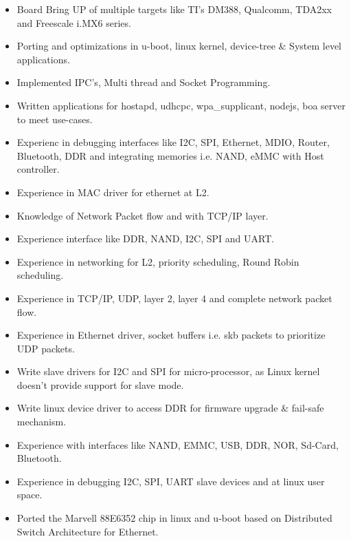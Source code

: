 \begin{minipage}[b]{\textwidth}%
  \setlength{\textwidth}{20cm}
    \footnotesize {%
       \begin{itemize}[itemindent=0pt,rightmargin=0pt, label={\textendash}, nosep]
          \item Board Bring UP of multiple targets like TI's DM388, Qualcomm, TDA2xx and Freescale i.MX6 series.
          \item Porting and optimizations in u-boot, linux kernel, device-tree \& System level applications.
          \item Implemented IPC's, Multi thread and Socket Programming.
          \item Written applications for hostapd, udhcpc, wpa\_supplicant, nodejs, boa server to meet use-cases.
          \item Experienc in debugging interfaces like I2C, SPI, Ethernet, MDIO, Router, Bluetooth, DDR and integrating memories i.e. NAND, eMMC with Host controller.
          \item Experience in MAC driver for ethernet at L2.
          \item Knowledge of Network Packet flow and with TCP/IP layer.
          \item Experience interface like DDR, NAND, I2C, SPI and UART.
          \item Experience in networking for L2, priority scheduling, Round Robin scheduling.
          \item Experience in TCP/IP, UDP, layer 2, layer 4 and complete network packet flow.
          \item Experience in Ethernet driver, socket buffers i.e. skb packets to prioritize UDP packets.
          \item Write slave drivers for I2C and SPI for micro-processor, as Linux kernel doesn’t provide support for slave mode.
          \item Write linux device driver to access DDR for firmware upgrade \& fail-safe mechanism.
          \item Experience with interfaces like NAND, EMMC, USB, DDR, NOR, Sd-Card, Bluetooth.
          \item Experience in debugging I2C, SPI, UART slave devices and at linux user space.
          \item Ported the Marvell 88E6352 chip in linux and u-boot based on Distributed Switch Architecture for Ethernet.
   \end{itemize}\vspace{6pt}%
    }%
\end{minipage}
